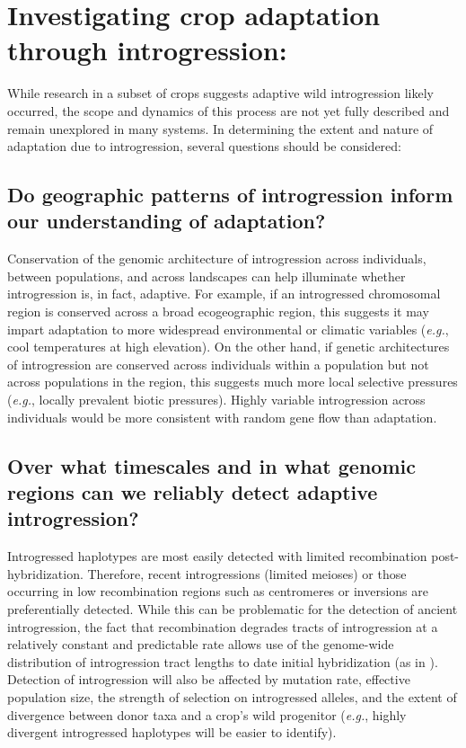 \documentclass[11pt]{article}
\begin{document}
\section*{Investigating crop adaptation through introgression:}

While research in a subset of crops suggests adaptive wild introgression likely occurred, the scope and dynamics of this process are not yet fully described and remain unexplored in many systems.
In determining the extent and nature of adaptation due to introgression, several questions should be considered:

\subsection*{Do geographic patterns of introgression inform our understanding of adaptation?}
Conservation of the genomic architecture of introgression across individuals,  between populations, and across landscapes can help illuminate whether introgression is, in fact, adaptive.
For example, if an introgressed chromosomal region is conserved across a broad ecogeographic region, this suggests it may impart adaptation to more widespread environmental or climatic variables (\emph{e.g.}, cool temperatures at high elevation).
On the other hand, if genetic architectures of introgression are conserved across individuals within a population but not across populations in the region, this suggests much more local selective pressures (\emph{e.g.}, locally prevalent biotic pressures).
Highly variable introgression across individuals would be more consistent with random gene flow than adaptation.

\subsection*{Over what timescales and in what genomic regions can we reliably detect adaptive introgression?}
Introgressed haplotypes are most easily detected with limited recombination post-hybridization.
Therefore, recent introgressions (limited meioses) or those occurring in low recombination regions such as centromeres or inversions are preferentially detected.
While this can be problematic for the detection of ancient introgression, the fact that recombination degrades tracts of introgression at a relatively constant and predictable rate allows use of the genome-wide distribution of introgression tract lengths to date initial hybridization (as in \cite{Poets2015}).
Detection of introgression will also be affected by mutation rate, effective population size, the strength of selection on introgressed alleles, and the extent of divergence between donor taxa and a crop's wild progenitor (\emph{e.g.}, highly divergent introgressed haplotypes will be easier to identify).
\end{document}
